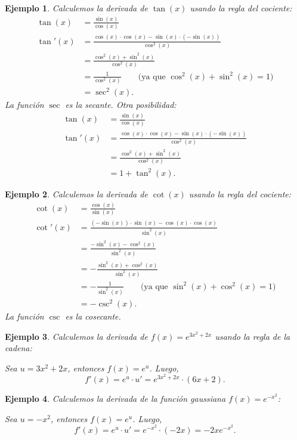 \documentclass[12pt, a4paper]{article}
\theoremstyle{rioplatense}
\newtheorem{ejemplo}{Ejemplo}[section]
\begin{document}
\begin{ejemplo}
Calculemos la derivada de $\tan(x)$ usando la regla del cociente:
\[
\begin{aligned}
\tan(x) &= \frac{\sin(x)}{\cos(x)} \\[0.5em]
\tan'(x) &= \frac{\cos(x) \cdot \cos(x) - \sin(x) \cdot (-\sin(x))}{\cos^2(x)} \\[0.5em]
&= \frac{\cos^2(x) + \sin^2(x)}{\cos^2(x)} \\[0.5em]
&= \frac{1}{\cos^2(x)} \qquad \text{(ya que } \cos^2(x) + \sin^2(x) = 1\text{)} \\[0.5em]
&= \sec^2(x).
\end{aligned}
\]
La funci\'on $\sec$ es la secante.
Otra posibilidad:
\[
\begin{aligned}
\tan(x) &= \frac{\sin(x)}{\cos(x)} \\[0.5em]
\tan'(x) &= \frac{\cos(x) \cdot \cos(x) - \sin(x) \cdot (-\sin(x))}{\cos^2(x)} \\[0.5em]
&= \frac{\cos^2(x) + \sin^2(x)}{\cos^2(x)} \\[0.5em]
&= 1 + 
\tan^2(x).
\end{aligned}
\]
\end{ejemplo}

\begin{ejemplo}
Calculemos la derivada de $\cot(x)$ usando la regla del cociente:
\[
\begin{aligned}
\cot(x) &= \frac{\cos(x)}{\sin(x)} \\[0.5em]
\cot'(x) &= \frac{(-\sin(x)) \cdot \sin(x) - \cos(x) \cdot \cos(x)}{\sin^2(x)} \\[0.5em]
&= \frac{-\sin^2(x) - \cos^2(x)}{\sin^2(x)} \\[0.5em]
&= -\frac{\sin^2(x) + \cos^2(x)}{\sin^2(x)} \\[0.5em]
&= -\frac{1}{\sin^2(x)} \qquad \text{(ya que } \sin^2(x) + \cos^2(x) = 1\text{)} \\[0.5em]
&= -\csc^2(x).
\end{aligned}
\]
La funci\'on $\csc$ es la cosecante.
\end{ejemplo}

\begin{ejemplo}
Calculemos la derivada de $f(x) = e^{3x^2 + 2x}$ usando la regla de la cadena:

Sea $u = 3x^2 + 2x$, entonces $f(x) = e^u$. Luego,
$$
f'(x) = e^u \cdot u' = e^{3x^2 + 2x} \cdot (6x + 2).
$$
\end{ejemplo}

\begin{ejemplo}
Calculemos la derivada de la función gaussiana $f(x) = e^{-x^2}$:

Sea $u = -x^2$, entonces $f(x) = e^u$. Luego,
$$
f'(x) = e^u \cdot u' = e^{-x^2} \cdot (-2x) = -2x e^{-x^2}.
$$
\end{ejemplo}
\end{document}
